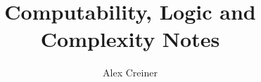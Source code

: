 \documentclass{article}
\title{Computability, Logic and Complexity Notes}
\author{Alex Creiner}
\date{}
\theoremstyle{definition}
\theoremstyle{plain}
\theoremstyle{theorem}
\begin{document}
\maketitle

\tableofcontents















% 


\appendix



\printbibliography

\iffalse
\end{document}
